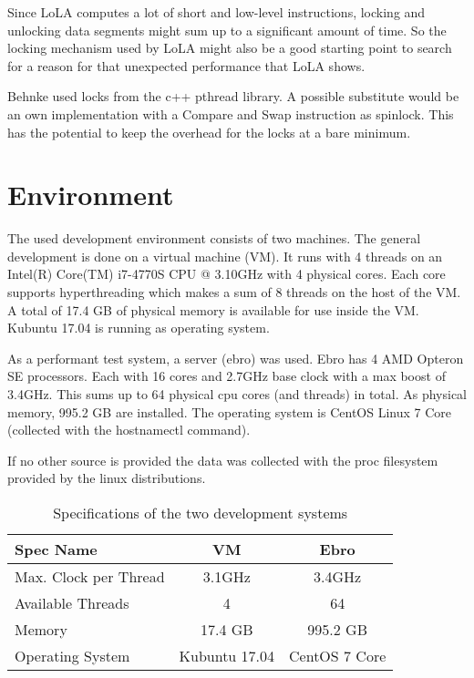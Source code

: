 Since LoLA computes a lot of short and low-level instructions, locking and unlocking data segments might sum up to a significant amount of time. So the locking mechanism used by LoLA might also be a good starting point to search for a reason for that unexpected performance that LoLA shows.

Behnke used locks from the c++ pthread library. A possible substitute would be an own implementation with a Compare and Swap instruction as spinlock. This has the potential to keep the overhead for the locks at a bare minimum.

\section{Environment}
\label{env}
The used development environment consists of two machines. The general development is done on a virtual machine (VM). It runs with 4 threads on an Intel(R) Core(TM) i7-4770S CPU @ 3.10GHz with 4 physical cores. Each core supports hyperthreading which makes a sum of 8 threads on the host of the VM. A total of 17.4 GB of physical memory is available for use inside the VM. Kubuntu 17.04 is running as operating system.

As a performant test system, a server (ebro) was used. Ebro has 4 AMD Opteron SE processors. Each with 16 cores and 2.7GHz base clock with a max boost of 3.4GHz\cite{AMDSpecs}. This sums up to 64 physical cpu cores (and threads) in total. As physical memory, 995.2 GB are installed. The operating system is CentOS Linux 7 Core (collected with the hostnamectl command).

If no other source is provided the data was collected with the proc filesystem provided by the linux distributions.
\begin{center}
    \begin{table}[H]
        \centering
        \begin{tabular}{ | l | c | c |}
            \hline
            \textbf{Spec Name} & \textbf{VM} & \textbf{Ebro} \\ \hline
            Max. Clock per Thread & 3.1GHz & 3.4GHz \\ 
            Available Threads & 4 & 64 \\ 
            Memory & 17.4 GB & 995.2 GB\\ 
            Operating System & Kubuntu 17.04 & CentOS 7 Core \\ \hline
        \end{tabular}
        \caption{Specifications of the two development systems}
    \end{table}
\end{center}


